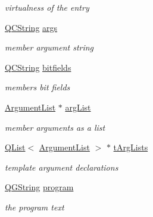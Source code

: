 \begin{DoxyCompactItemize}
\begin{DoxyCompactList}\small\item\em virtualness of the entry \end{DoxyCompactList}\item 
\mbox{\label{class_entry_a795acc50f8bb2497b2385ee715304076}} 
\mbox{\hyperlink{class_q_c_string}{Q\+C\+String}} \mbox{\hyperlink{class_entry_a795acc50f8bb2497b2385ee715304076}{args}}
\begin{DoxyCompactList}\small\item\em member argument string \end{DoxyCompactList}\item 
\mbox{\label{class_entry_a239e75c28fe009869cf25e681d2a2d41}} 
\mbox{\hyperlink{class_q_c_string}{Q\+C\+String}} \mbox{\hyperlink{class_entry_a239e75c28fe009869cf25e681d2a2d41}{bitfields}}
\begin{DoxyCompactList}\small\item\em member\textquotesingle{}s bit fields \end{DoxyCompactList}\item 
\mbox{\label{class_entry_a7dfa4587991698fbc8550e563cd71948}} 
\mbox{\hyperlink{class_argument_list}{Argument\+List}} $\ast$ \mbox{\hyperlink{class_entry_a7dfa4587991698fbc8550e563cd71948}{arg\+List}}
\begin{DoxyCompactList}\small\item\em member arguments as a list \end{DoxyCompactList}\item 
\mbox{\label{class_entry_a6fe1bee76d0edf07bdae161814b8e490}} 
\mbox{\hyperlink{class_q_list}{Q\+List}}$<$ \mbox{\hyperlink{class_argument_list}{Argument\+List}} $>$ $\ast$ \mbox{\hyperlink{class_entry_a6fe1bee76d0edf07bdae161814b8e490}{t\+Arg\+Lists}}
\begin{DoxyCompactList}\small\item\em template argument declarations \end{DoxyCompactList}\item 
\mbox{\label{class_entry_a8aa37e42f17105b914db76b0c05d0a1f}} 
\mbox{\hyperlink{class_q_g_string}{Q\+G\+String}} \mbox{\hyperlink{class_entry_a8aa37e42f17105b914db76b0c05d0a1f}{program}}
\begin{DoxyCompactList}\small\item\em the program text \end{DoxyCompactList}\item 

\end{DoxyCompactItemize}
